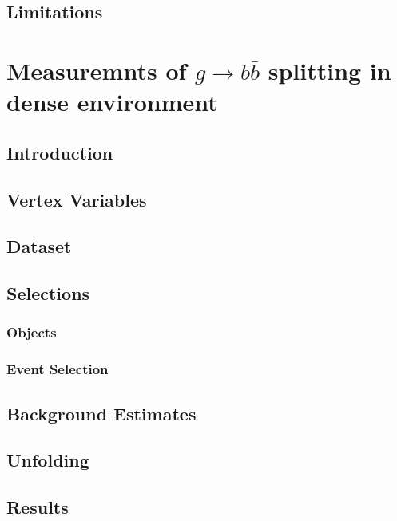 \documentclass{report}
\begin{document}
\section{Limitations}


\chapter{Measuremnts of $g\rightarrow b\bar{b}$ splitting in dense environment}
\label{chap:gbb}
\section{Introduction}


\section{Vertex Variables}


\section{Dataset}


\section{Selections}
\subsection{Objects}

\subsection{Event Selection}


\section{Background Estimates}



\section{Unfolding}


\section{Results}

\end{document}
